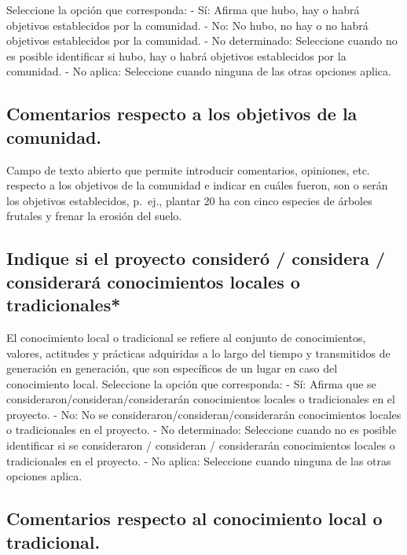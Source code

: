 \documentclass[
]{book}
\begin{document}
Seleccione la opción que corresponda:
- Sí: Afirma que hubo, hay o habrá objetivos establecidos por la comunidad.
- No: No hubo, no hay o no habrá objetivos establecidos por la comunidad.
- No determinado: Seleccione cuando no es posible identificar si hubo, hay o habrá objetivos establecidos por la comunidad.
- No aplica: Seleccione cuando ninguna de las otras opciones aplica.

\hypertarget{comentarios-respecto-a-los-objetivos-de-la-comunidad.}{%
\subsection{Comentarios respecto a los objetivos de la comunidad.}\label{comentarios-respecto-a-los-objetivos-de-la-comunidad.}}

Campo de texto abierto que permite introducir comentarios, opiniones, etc. respecto a los objetivos de la comunidad e indicar en cuáles fueron, son o serán los objetivos establecidos, p.~ej., plantar 20 ha con cinco especies de árboles frutales y frenar la erosión del suelo.

\hypertarget{indique-si-el-proyecto-consideruxf3-considera-consideraruxe1-conocimientos-locales-o-tradicionales}{%
\subsection{Indique si el proyecto consideró / considera / considerará conocimientos locales o tradicionales*}\label{indique-si-el-proyecto-consideruxf3-considera-consideraruxe1-conocimientos-locales-o-tradicionales}}

El conocimiento local o tradicional se refiere al conjunto de conocimientos, valores, actitudes y prácticas adquiridas a lo largo del tiempo y transmitidos de generación en generación, que son específicos de un lugar en caso del conocimiento local.
Seleccione la opción que corresponda:
- Sí: Afirma que se consideraron/consideran/considerarán conocimientos locales o tradicionales en el proyecto.
- No: No se consideraron/consideran/considerarán conocimientos locales o tradicionales en el proyecto.
- No determinado: Seleccione cuando no es posible identificar si se consideraron / consideran / considerarán conocimientos locales o tradicionales en el proyecto.
- No aplica: Seleccione cuando ninguna de las otras opciones aplica.

\hypertarget{comentarios-respecto-al-conocimiento-local-o-tradicional.}{%
\subsection{Comentarios respecto al conocimiento local o tradicional.}\label{comentarios-respecto-al-conocimiento-local-o-tradicional.}}
\end{document}
